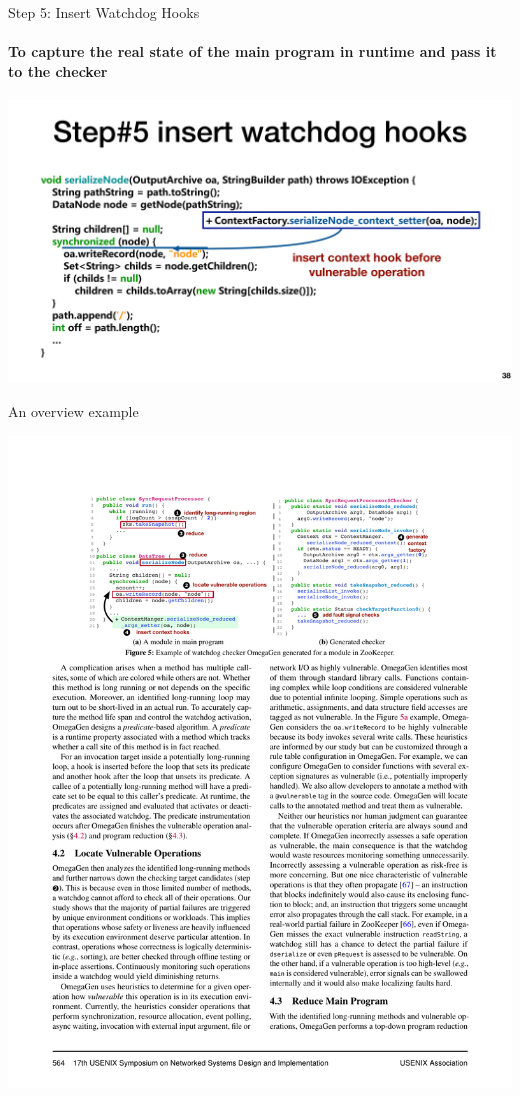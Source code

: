 \documentclass[aspectratio=169]{beamer}
\begin{document}
\begin{frame}{Step 5: Insert Watchdog Hooks}
    \framesubtitle{To capture the real state of the main program in runtime and pass it to the checker}
    \begin{center}
        \includegraphics[width=.95\textwidth]{fig/hook}
    \end{center}
\end{frame}

\begin{frame}{An overview example}
    \begin{center}
        \includegraphics[width=\textwidth]{fig/compare}
    \end{center}
\end{frame}
\end{document}
